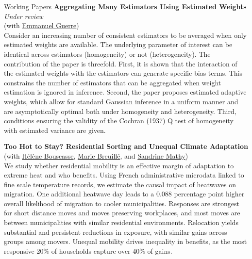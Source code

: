\documentclass{resume} %
\begin{document}
\begin{rSection}{Working Papers}
		\textbf{Aggregating Many Estimators Using Estimated Weights} \\[2pt]
		\textit{Under review} \\[2pt]
		(with \href{https://eoguerre.github.io/}{Emmanuel Guerre}) \\[5pt]
		Consider an increasing number of consistent estimators to be averaged when only estimated weights are available. The underlying parameter of interest can be identical across estimators (homogeneity) or not (heterogeneity). The contribution of the paper is threefold. First, it is shown that the interaction of the estimated weights with the estimators can generate specific bias terms. This constrains the number of estimators that can be aggregated when weight estimation is ignored in inference. Second, the paper proposes estimated adaptive weights, which allow for standard Gaussian inference in a uniform manner and are asymptotically optimal both under homogeneity and heterogeneity. Third, conditions ensuring the validity of the Cochran (1937) Q test of homogeneity with estimated variance are given.
		
		
		\textbf{Too Hot to Stay? Residential Sorting and Unequal Climate Adaptation} \\[2pt]
		(with \href{https://sites.google.com/view/helene-bouscasse/accueil?authuser=0}{Hélène Bouscasse}, \href{https://sites.google.com/site/breuillemarie/}{Marie Breuillé}, and \href{https://gael.univ-grenoble-alpes.fr/en/sandrine-mathy}{Sandrine Mathy}) \\[5pt]
		We study whether residential mobility is an effective margin of adaptation to extreme heat and who benefits. Using French administrative microdata linked to fine scale temperature records, we estimate the causal impact of heatwaves on migration. One additional heatwave day leads to a 0.088 percentage point higher overall likelihood of migration to cooler municipalities. Responses are strongest for short distance moves and moves preserving workplaces, and most moves are between municipalities with similar residential environments. Relocation yields substantial and persistent reductions in exposure, with similar gains across groups among movers. Unequal mobility drives inequality in benefits, as the most responsive 20\% of households capture over 40\% of gains.
		
		
	\end{rSection}
	
	
\end{document}
